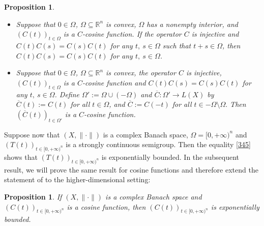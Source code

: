 \documentclass{amsart}
\newtheorem{prop}[thm]{Proposition}
\theoremstyle{definition}
\theoremstyle{remark}
\numberwithin{equation}{section}
\begin{document}
\begin{prop}\label{df}
\begin{itemize}
\item[(i)] 
Suppose that $0\in \Omega$, $\Omega  \subseteq {\mathbb R}^{n}$ is convex, $\Omega$ has a nonempty interior, and $(C(t))_{t\in \Omega}$ 
is a $C$-cosine function. If the operator $C$ is injective and $C(t)C(s)=C(s)C(t)$ for any $t,\ s\in \Omega$ such that $t+s \in \Omega$, then $C(t)C(s)=C(s)C(t)$ for any $t,\ s\in \Omega$.
\item[(ii)] Suppose that $0\in \Omega$, $\Omega  \subseteq {\mathbb R}^{n}$ is convex, the operator $C$ is injective, $(C(t))_{t\in \Omega}$ 
is a $C$-cosine function and $C(t)C(s)=C(s)C(t)$ for any $t,\ s\in \Omega$. Define $\Omega':=\Omega \cup (-\Omega)$ and $\overline{C} : \Omega' \rightarrow L(X)$ by $\overline{C}(t):=C(t)$ for all $t\in \Omega$, and $\overline{C}:=C(-t)$ for all $t\in -\Omega \setminus \Omega.$ Then $(\overline{C}(t))_{t\in \Omega'}$ is a $C$-cosine function.
\end{itemize}
\end{prop}

Suppose now that $(X,\| \cdot \|)$ is a complex Banach space, $\Omega=[0,+\infty)^{n}$ and $(T(t))_{t\in [0,+\infty)^{n}}$ is a strongly continuous semigroup. Then the equality \eqref{345} shows that $(T(t))_{t\in [0,+\infty)^{n}}$ is exponentially bounded.
In the subsequent result, we will prove the same 
result for cosine functions and therefore 
extend the statement of \cite[Lemma 3.14.3; a)]{a43} to the higher-dimensional setting:

\begin{prop}\label{cos}
If $(X,\| \cdot \|)$ is a complex Banach space and $(C(t))_{t\in [0,+\infty)^{n}}$ is a cosine function, then $(C(t))_{t\in [0,+\infty)^{n}}$ is exponentially bounded.
\end{prop}
\end{document}
